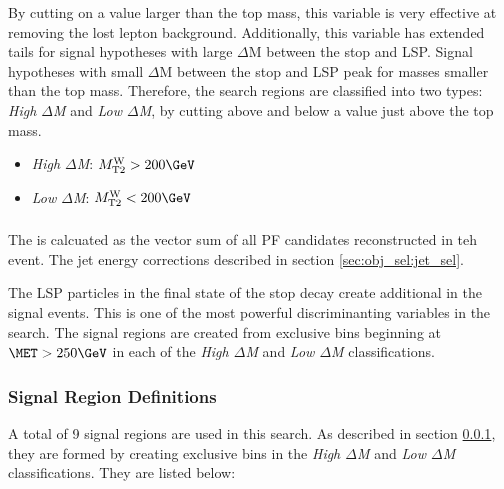 By cutting on a value larger than the top mass, this variable is very effective at removing the \ttbar lost lepton background.  Additionally, this variable has extended tails for signal hypotheses with large $\Delta$M between the stop and LSP.  Signal hypotheses with small $\Delta$M between the stop and LSP peak for masses smaller than the top mass.  Therefore, the search regions are classified into two types: \textit{High $\Delta$M} and \textit{Low $\Delta$M}, by cutting above and below a value just above the top mass. 

\begin{itemize}
  \item \textit{High $\Delta$M}: $\MTtW>200\GeV$
  \item \textit{Low $\Delta$M}: $\MTtW<200\GeV$
\end{itemize}


\subsubsection{ \MET}
\label{sec:obj_sel:met}

The \MET is calcuated as the vector sum of all PF candidates reconstructed in teh event.  The jet energy corrections described in section \ref{sec:obj_sel:jet_sel}.  

The LSP particles in the final state of the stop decay create additional \MET in the signal events.  This is one of the most powerful discriminanting variables in the search.  The signal regions are created from exclusive \MET bins beginning at $\MET>250\GeV$ in each of the \textit{High $\Delta$M} and \textit{Low $\Delta$M} classifications.  


\subsubsection{ Signal Region Definitions }
\label{sec:obj_sel:signal_regions}

A total of 9 signal regions are used in this search.  As described in section \ref{sec:obj_sel:met}, they are formed by creating exclusive \MET bins in the \textit{High $\Delta$M} and \textit{Low $\Delta$M} classifications.  They are listed below:

